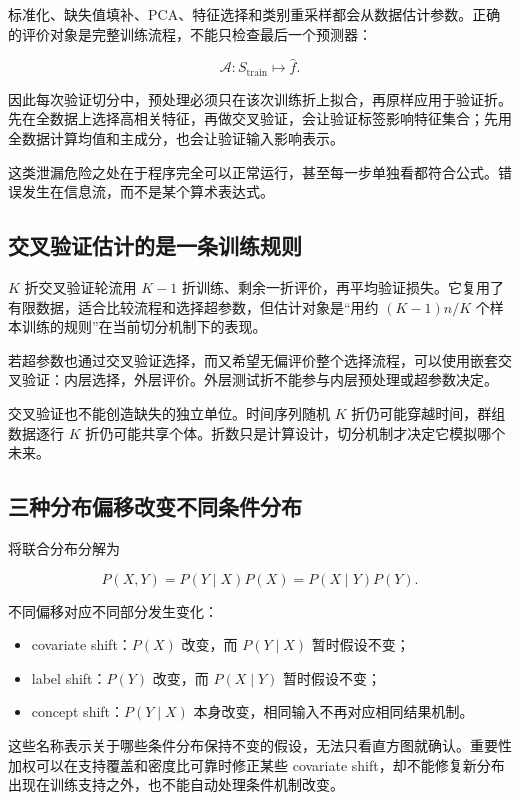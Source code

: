 标准化、缺失值填补、PCA、特征选择和类别重采样都会从数据估计参数。正确的评价对象是完整训练流程，不能只检查最后一个预测器：

\[
\mathcal A:S_{\mathrm{train}}\longmapsto \widehat f.
\]

因此每次验证切分中，预处理必须只在该次训练折上拟合，再原样应用于验证折。先在全数据上选择高相关特征，再做交叉验证，会让验证标签影响特征集合；先用全数据计算均值和主成分，也会让验证输入影响表示。

这类泄漏危险之处在于程序完全可以正常运行，甚至每一步单独看都符合公式。错误发生在信息流，而不是某个算术表达式。

\subsection{交叉验证估计的是一条训练规则}

\(K\) 折交叉验证轮流用 \(K-1\) 折训练、剩余一折评价，再平均验证损失。它复用了有限数据，适合比较流程和选择超参数，但估计对象是``用约 \((K-1)n/K\) 个样本训练的规则''在当前切分机制下的表现。

若超参数也通过交叉验证选择，而又希望无偏评价整个选择流程，可以使用嵌套交叉验证：内层选择，外层评价。外层测试折不能参与内层预处理或超参数决定。

交叉验证也不能创造缺失的独立单位。时间序列随机 \(K\) 折仍可能穿越时间，群组数据逐行 \(K\) 折仍可能共享个体。折数只是计算设计，切分机制才决定它模拟哪个未来。

\subsection{三种分布偏移改变不同条件分布}

将联合分布分解为

\[
P(X,Y)=P(Y\mid X)P(X)
       =P(X\mid Y)P(Y).
\]

不同偏移对应不同部分发生变化：

\begin{itemize}
\tightlist
\item
  covariate shift：\(P(X)\) 改变，而 \(P(Y\mid X)\) 暂时假设不变；
\item
  label shift：\(P(Y)\) 改变，而 \(P(X\mid Y)\) 暂时假设不变；
\item
  concept shift：\(P(Y\mid X)\) 本身改变，相同输入不再对应相同结果机制。
\end{itemize}

这些名称表示关于哪些条件分布保持不变的假设，无法只看直方图就确认。重要性加权可以在支持覆盖和密度比可靠时修正某些 covariate shift，却不能修复新分布出现在训练支持之外，也不能自动处理条件机制改变。

